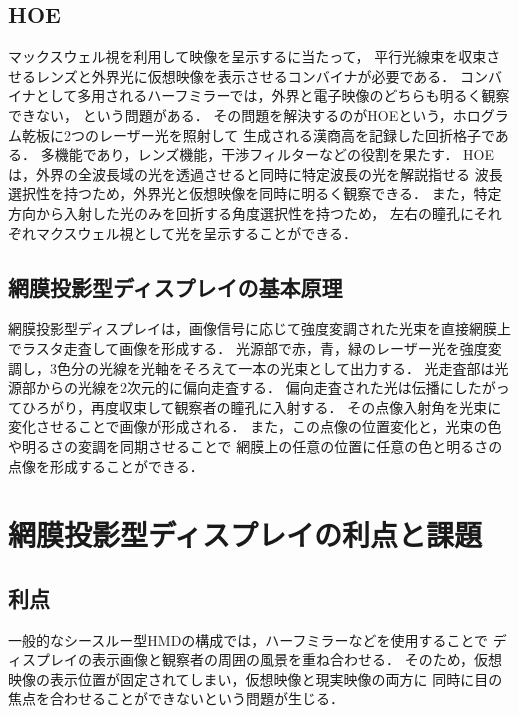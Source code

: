 \documentclass[dvipdfmx]{ujarticle}
\begin{document}
\cite{FIT2002}
\cite{RetinalPSD}
\cite{ITE2014}

\subsection{HOE}
マックスウェル視を利用して映像を呈示するに当たって，
平行光線束を収束させるレンズと外界光に仮想映像を表示させるコンバイナが必要である．
コンバイナとして多用されるハーフミラーでは，外界と電子映像のどちらも明るく観察できない，
という問題がある．
その問題を解決するのがHOEという，ホログラム乾板に2つのレーザー光を照射して
生成される漢商高を記録した回折格子である．
多機能であり，レンズ機能，干渉フィルターなどの役割を果たす．
HOEは，外界の全波長域の光を透過させると同時に特定波長の光を解説指せる
波長選択性を持つため，外界光と仮想映像を同時に明るく観察できる．
また，特定方向から入射した光のみを回折する角度選択性を持つため，
左右の瞳孔にそれぞれマクスウェル視として光を呈示することができる．

\cite{3DIC2000}
\cite{RetinalPSD}
\cite{ITE2014}

\subsection{網膜投影型ディスプレイの基本原理}
網膜投影型ディスプレイは，画像信号に応じて強度変調された光束を直接網膜上でラスタ走査して画像を形成する．
光源部で赤，青，緑のレーザー光を強度変調し，3色分の光線を光軸をそろえて一本の光束として出力する．
光走査部は光源部からの光線を2次元的に偏向走査する．
偏向走査された光は伝播にしたがってひろがり，再度収束して観察者の瞳孔に入射する．
その点像入射角を光束に変化させることで画像が形成される．
また，この点像の位置変化と，光束の色や明るさの変調を同期させることで
網膜上の任意の位置に任意の色と明るさの点像を形成することができる．

\cite{ITE2011}

\section{網膜投影型ディスプレイの利点と課題}
\subsection{利点}
一般的なシースルー型HMDの構成では，ハーフミラーなどを使用することで
ディスプレイの表示画像と観察者の周囲の風景を重ね合わせる．
そのため，仮想映像の表示位置が固定されてしまい，仮想映像と現実映像の両方に
同時に目の焦点を合わせることができないという問題が生じる．
\end{document}
